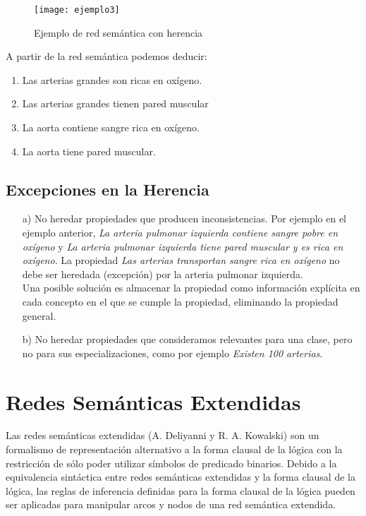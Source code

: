 \documentclass[12pt]{article}
\begin{document}
\begin{figure}[H]
\centering
\texttt{[image: ejemplo3]}
\caption{Ejemplo de red semántica con herencia} \label{fig:ejemplo3}
\end{figure}

A partir de la red semántica podemos deducir:
\begin{enumerate}
\item Las arterias grandes son ricas en oxígeno.
\item Las arterias grandes tienen pared muscular
\item La aorta contiene sangre rica en oxígeno.
\item La aorta tiene pared muscular.
\end{enumerate}

\subsection{Excepciones en la Herencia}
\begin{enumerate}
\item[a)] No heredar propiedades que producen inconsistencias. Por ejemplo en el ejemplo anterior, \textit{La arteria pulmonar izquierda contiene sangre pobre en oxígeno} y \textit{La arteria pulmonar izquierda tiene pared muscular y es rica en oxígeno}. La propiedad \textit{Las arterias transportan sangre rica en oxígeno} no debe ser heredada (excepción) por la arteria pulmonar izquierda.\\
Una posible solución es almacenar la propiedad como información explícita en cada concepto en el que se cumple la propiedad, eliminando la propiedad general.
\item[b)] No heredar propiedades que consideramos relevantes para una clase, pero no para sus especializaciones, como por ejemplo \textit{Existen 100 arterias}.
\end{enumerate}
\section{Redes Semánticas Extendidas}
Las redes semánticas extendidas (A. Deliyanni y R. A. Kowalski) son un formalismo de representación alternativo a la forma clausal de la lógica con la restricción de sólo poder utilizar símbolos de predicado binarios. Debido a la equivalencia sintáctica entre redes semánticas extendidas y la forma clausal de la lógica, las reglas de inferencia definidas para la forma clausal de la lógica pueden ser aplicadas para manipular arcos y nodos de una red semántica extendida.\\
\end{document}
